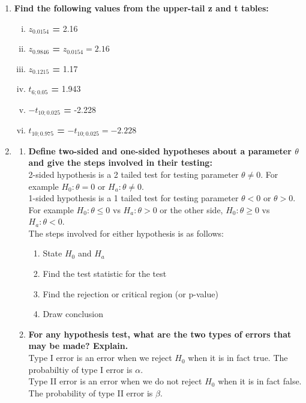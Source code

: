 \documentclass{article}
\begin{document}
\begin{enumerate}[1.]
\item
\textbf{Find the following values from the upper-tail z and t tables:}
\begin{enumerate}[(i)]
  \item \textbf{$z_{0.0154}$ = } 2.16
  \item \textbf{$z_{0.9846}$ = } $z_{0.0154} = 2.16$
  \item \textbf{$z_{0.1215}$ = } 1.17
  \item \textbf{$t_{6;0.05}$ = } 1.943
  \item \textbf{$-t_{10;0.025}$ = } -2.228
  \item \textbf{$t_{10;0.975}$ = } $-t_{10;0.025} = -2.228$ 
\end{enumerate}

\item
\begin{enumerate}[a]
  \item \textbf{Define two-sided and one-sided hypotheses about a parameter $\theta$ and give the steps involved in their testing: }
\\
2-sided hypothesis is a 2 tailed test for testing parameter $\theta \neq 0$. For example $H_0 : \theta = 0$ or $H_a : \theta \neq 0$.
\\
1-sided hypothesis is a 1 tailed test for testing parameter $\theta < 0$ or $\theta > 0$. For example $H_0 : \theta \leq 0$ vs $H_a: \theta > 0$ or the other side, $H_0 : \theta \geq 0$ vs $H_a : \theta < 0$.
\\
The steps involved for either hypothesis is as follows:
\begin{enumerate}[1)]
  \item State $H_0$ and $H_a$
  \item Find the test statistic for the test
  \item Find the rejection or critical region (or p-value)
  \item Draw conclusion
\end{enumerate}

  \item \textbf{For any hypothesis test, what are the two types of errors that may be made? Explain.}
\\
Type I error is an  error when we reject $H_0$ when it is in fact true. The probabiltiy of type I error is $\alpha$.
\\
Type II error is an error when we do not reject $H_0$ when it is in fact false. The probability of type II error is $\beta$.
\end{enumerate}


\end{enumerate}
\end{document}

